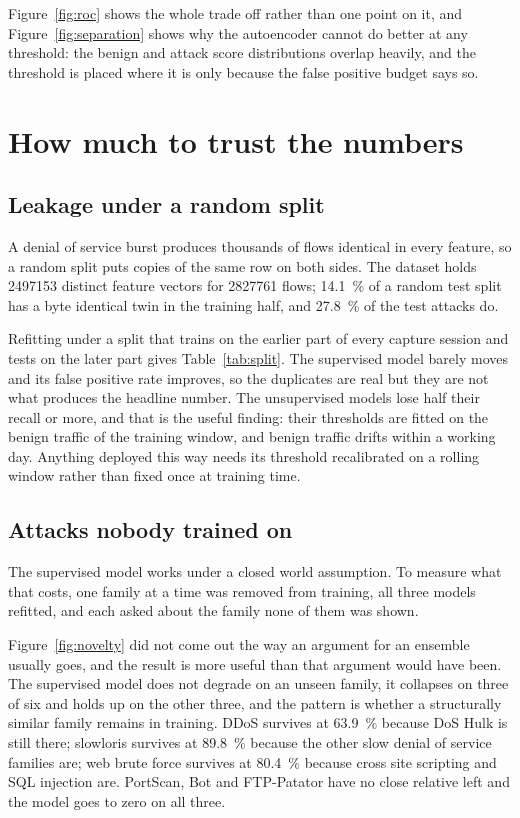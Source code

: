 \documentclass[9pt,a4paper,twocolumn]{article}
\begin{document}
Figure~\ref{fig:roc} shows the whole trade off rather than one point on it, and
Figure~\ref{fig:separation} shows why the autoencoder cannot do better at any
threshold: the benign and attack score distributions overlap heavily, and the
threshold is placed where it is only because the false positive budget says so.

\section{How much to trust the numbers}

\subsection{Leakage under a random split}

A denial of service burst produces thousands of flows identical in every
feature, so a random split puts copies of the same row on both sides. The
dataset holds \num{2497153} distinct feature vectors for \num{2827761} flows;
\SI{14.1}{\percent} of a random test split has a byte identical twin in the
training half, and \SI{27.8}{\percent} of the test attacks do.

Refitting under a split that trains on the earlier part of every capture session
and tests on the later part gives Table~\ref{tab:split}. The supervised model
barely moves and its false positive rate improves, so the duplicates are real
but they are not what produces the headline number. The unsupervised models lose
half their recall or more, and that is the useful finding: their thresholds are
fitted on the benign traffic of the training window, and benign traffic drifts
within a working day. Anything deployed this way needs its threshold
recalibrated on a rolling window rather than fixed once at training time.

\subsection{Attacks nobody trained on}

The supervised model works under a closed world assumption. To measure what
that costs, one family at a time was removed from training, all three models
refitted, and each asked about the family none of them was shown.

Figure~\ref{fig:novelty} did not come out the way an argument for an ensemble
usually goes, and the result is more useful than that argument would have been.
The supervised model does not degrade on an unseen family, it collapses on
three of six and holds up on the other three, and the pattern is whether a
structurally similar family remains in training. DDoS survives at
\SI{63.9}{\percent} because DoS Hulk is still there; slowloris survives at
\SI{89.8}{\percent} because the other slow denial of service families are; web
brute force survives at \SI{80.4}{\percent} because cross site scripting and SQL
injection are. PortScan, Bot and FTP-Patator have no close relative left and the
model goes to zero on all three.
\end{document}
